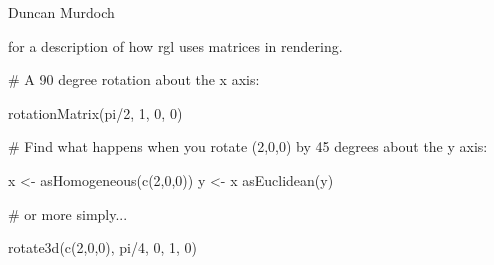 \documentclass{article}
\begin{document}
\begin{Author}\relax
Duncan Murdoch
\end{Author}
\begin{SeeAlso}\relax
{} for a description of how rgl uses matrices in
rendering.
\end{SeeAlso}
\begin{Examples}
\begin{ExampleCode}
# A 90 degree rotation about the x axis:

rotationMatrix(pi/2, 1, 0, 0)

# Find what happens when you rotate (2,0,0) by 45 degrees about the y axis:

x <- asHomogeneous(c(2,0,0))
y <- x 
asEuclidean(y)

# or more simply...

rotate3d(c(2,0,0), pi/4, 0, 1, 0)

\end{ExampleCode}
\end{Examples}
\end{document}
